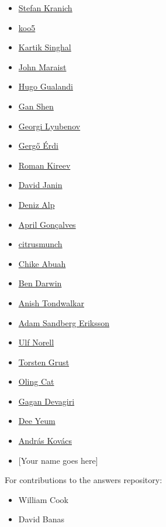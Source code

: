 \begin{itemize}
\item
  \href{https://github.com/kranich}{Stefan Kranich}
\item
  \href{https://github.com/koo5}{koo5}
\item
  \href{https://github.com/k4rtik}{Kartik Singhal}
\item
  \href{https://github.com/jphmrst}{John Maraist}
\item
  \href{https://github.com/hugomg}{Hugo Gualandi}
\item
  \href{https://github.com/gshen42}{Gan Shen}
\item
  \href{https://github.com/googleson78}{Georgi Lyubenov}
\item
  \href{https://github.com/gergoerdi}{Gergő Érdi}
\item
  \href{https://github.com/effectfully}{Roman Kireev}
\item
  \href{https://github.com/djanin}{David Janin}
\item
  \href{https://github.com/dalpd}{Deniz Alp}
\item
  \href{https://github.com/cyberglot}{April Gonçalves}
\item
  \href{https://github.com/citrusmunch}{citrusmunch}
\item
  \href{https://github.com/chikeabuah}{Chike Abuah}
\item
  \href{https://github.com/bcdarwin}{Ben Darwin}
\item
  \href{https://github.com/atondwal}{Anish Tondwalkar}
\item
  \href{https://github.com/adamse}{Adam Sandberg Eriksson}
\item
  \href{https://github.com/UlfNorell}{Ulf Norell}
\item
  \href{https://github.com/Teggy}{Torsten Grust}
\item
  \href{https://github.com/OlingCat}{Oling Cat}
\item
  \href{https://github.com/GaganSD}{Gagan Devagiri}
\item
  \href{https://github.com/ChefYeum}{Dee Yeum}
\item
  \href{https://github.com/AndrasKovacs}{András Kovács}
\item
  {[}Your name goes here{]}
\end{itemize}

For contributions to the answers repository:

\begin{itemize}
\tightlist
\item
  William Cook
\item
  David Banas
\end{itemize}

